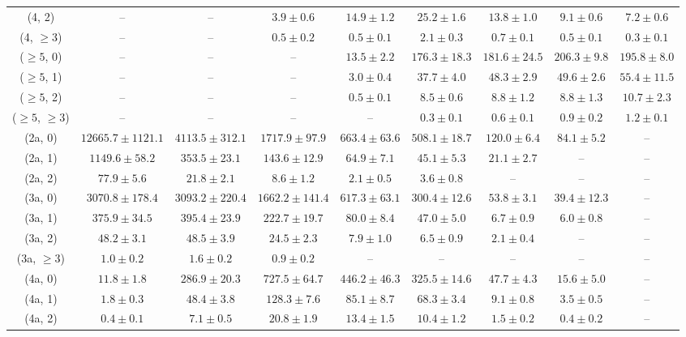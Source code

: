 \begin{table}[h!]
{\begin{tabular}{ccccccccc}
	(4, 2) & -- & -- & $3.9\pm 0.6$ & $14.9\pm 1.2$ & $25.2\pm 1.6$ & $13.8\pm 1.0$ & $9.1\pm 0.6$ & $7.2\pm 0.6$ \\[0.5ex] 
	(4, $\ge3$) & -- & -- & $0.5\pm 0.2$ & $0.5\pm 0.1$ & $2.1\pm 0.3$ & $0.7\pm 0.1$ & $0.5\pm 0.1$ & $0.3\pm 0.1$ \\[0.5ex] 
	($\ge5$, 0) & -- & -- & -- & $13.5\pm 2.2$ & $176.3\pm 18.3$ & $181.6\pm 24.5$ & $206.3\pm 9.8$ & $195.8\pm 8.0$ \\[0.5ex] 
	($\ge5$, 1) & -- & -- & -- & $3.0\pm 0.4$ & $37.7\pm 4.0$ & $48.3\pm 2.9$ & $49.6\pm 2.6$ & $55.4\pm 11.5$ \\[0.5ex] 
	($\ge5$, 2) & -- & -- & -- & $0.5\pm 0.1$ & $8.5\pm 0.6$ & $8.8\pm 1.2$ & $8.8\pm 1.3$ & $10.7\pm 2.3$ \\[0.5ex] 
	($\ge5$, $\ge3$) & -- & -- & -- & -- & $0.3\pm 0.1$ & $0.6\pm 0.1$ & $0.9\pm 0.2$ & $1.2\pm 0.1$ \\[0.5ex] 
	(2a, 0) & $12665.7\pm 1121.1$ & $4113.5\pm 312.1$ & $1717.9\pm 97.9$ & $663.4\pm 63.6$ & $508.1\pm 18.7$ & $120.0\pm 6.4$ & $84.1\pm 5.2$ & -- \\[0.5ex] 
	(2a, 1) & $1149.6\pm 58.2$ & $353.5\pm 23.1$ & $143.6\pm 12.9$ & $64.9\pm 7.1$ & $45.1\pm 5.3$ & $21.1\pm 2.7$ & -- & -- \\[0.5ex] 
	(2a, 2) & $77.9\pm 5.6$ & $21.8\pm 2.1$ & $8.6\pm 1.2$ & $2.1\pm 0.5$ & $3.6\pm 0.8$ & -- & -- & -- \\[0.5ex] 
	(3a, 0) & $3070.8\pm 178.4$ & $3093.2\pm 220.4$ & $1662.2\pm 141.4$ & $617.3\pm 63.1$ & $300.4\pm 12.6$ & $53.8\pm 3.1$ & $39.4\pm 12.3$ & -- \\[0.5ex] 
	(3a, 1) & $375.9\pm 34.5$ & $395.4\pm 23.9$ & $222.7\pm 19.7$ & $80.0\pm 8.4$ & $47.0\pm 5.0$ & $6.7\pm 0.9$ & $6.0\pm 0.8$ & -- \\[0.5ex] 
	(3a, 2) & $48.2\pm 3.1$ & $48.5\pm 3.9$ & $24.5\pm 2.3$ & $7.9\pm 1.0$ & $6.5\pm 0.9$ & $2.1\pm 0.4$ & -- & -- \\[0.5ex] 
	(3a, $\ge3$) & $1.0\pm 0.2$ & $1.6\pm 0.2$ & $0.9\pm 0.2$ & -- & -- & -- & -- & -- \\[0.5ex] 
	(4a, 0) & $11.8\pm 1.8$ & $286.9\pm 20.3$ & $727.5\pm 64.7$ & $446.2\pm 46.3$ & $325.5\pm 14.6$ & $47.7\pm 4.3$ & $15.6\pm 5.0$ & -- \\[0.5ex] 
	(4a, 1) & $1.8\pm 0.3$ & $48.4\pm 3.8$ & $128.3\pm 7.6$ & $85.1\pm 8.7$ & $68.3\pm 3.4$ & $9.1\pm 0.8$ & $3.5\pm 0.5$ & -- \\[0.5ex] 
	(4a, 2) & $0.4\pm 0.1$ & $7.1\pm 0.5$ & $20.8\pm 1.9$ & $13.4\pm 1.5$ & $10.4\pm 1.2$ & $1.5\pm 0.2$ & $0.4\pm 0.2$ & -- \\[0.5ex] 

\end{tabular}}
\end{table}
